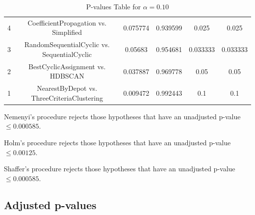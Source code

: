 \documentclass[a4paper,10pt]{article}
\begin{document}
\begin{landscape}
\begin{table}[!htp]
\begin{tabular}{cccccc}
4&CoefficientPropagation vs. Simplified&0.075774&0.939599&0.025&0.025\\
3&RandomSequentialCyclic vs. SequentialCyclic&0.05683&0.954681&0.033333&0.033333\\
2&BestCyclicAssignment vs. HDBSCAN&0.037887&0.969778&0.05&0.05\\
1&NearestByDepot vs. ThreeCriteriaClustering&0.009472&0.992443&0.1&0.1\\
\hline
\end{tabular}
\caption{P-values Table for $\alpha=0.10$}
\end{table}Nemenyi's procedure rejects those hypotheses that have an unadjusted p-value $\le0.000585$.

Holm's procedure rejects those hypotheses that have an unadjusted p-value $\le0.00125$.

Shaffer's procedure rejects those hypotheses that have an unadjusted p-value $\le0.000585$.

\pagebreak

\subsection{Adjusted p-values}


\end{landscape}
\end{document}
